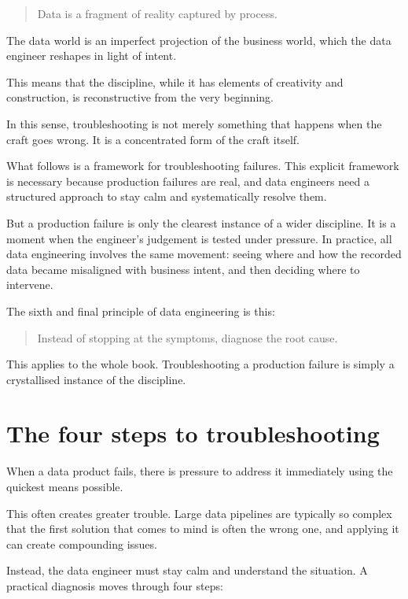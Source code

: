 \documentclass[10pt,openany,10pt]{book}
\begin{document}
\begin{quote}
Data is a fragment of reality captured by process.
\end{quote}

The data world is an imperfect projection of the business world, which
the data engineer reshapes in light of intent.

This means that the discipline, while it has elements of creativity and
construction, is reconstructive from the very beginning.

In this sense, troubleshooting is not merely something that happens when
the craft goes wrong. It is a concentrated form of the craft itself.

What follows is a framework for troubleshooting failures. This explicit
framework is necessary because production failures are real, and data
engineers need a structured approach to stay calm and systematically
resolve them.

But a production failure is only the clearest instance of a wider
discipline. It is a moment when the engineer's judgement is tested under
pressure. In practice, all data engineering involves the same movement:
seeing where and how the recorded data became misaligned with business
intent, and then deciding where to intervene.

The sixth and final principle of data engineering is this:

\begin{quote}
Instead of stopping at the symptoms, diagnose the root cause.
\end{quote}

This applies to the whole book. Troubleshooting a production failure is
simply a crystallised instance of the discipline.

\section{The four steps to
troubleshooting}\label{the-four-steps-to-troubleshooting}

When a data product fails, there is pressure to address it immediately
using the quickest means possible.

This often creates greater trouble. Large data pipelines are typically
so complex that the first solution that comes to mind is often the wrong
one, and applying it can create compounding issues.

Instead, the data engineer must stay calm and understand the situation.
A practical diagnosis moves through four steps:
\end{document}
